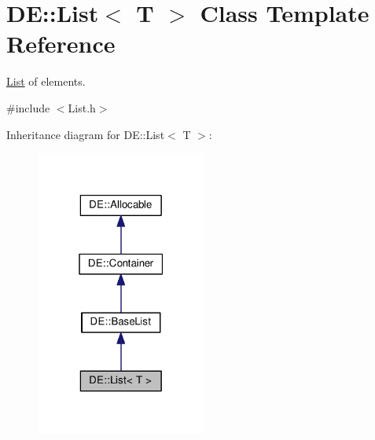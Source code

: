 \hypertarget{classDE_1_1List}{}\section{DE\+:\+:List$<$ T $>$ Class Template Reference}
\label{classDE_1_1List}


\hyperlink{classDE_1_1List}{List} of elements.  




{\ttfamily \#include $<$List.\+h$>$}



Inheritance diagram for DE\+:\+:List$<$ T $>$\+:\nopagebreak
\begin{figure}[H]
\begin{center}
\leavevmode
\includegraphics[width=159pt]{classDE_1_1List__inherit__graph}
\end{center}
\end{figure}


